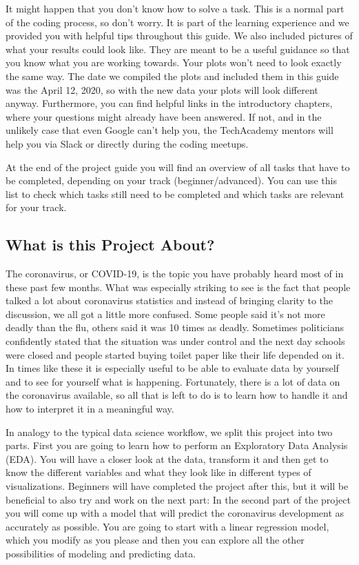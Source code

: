 \documentclass[
  11pt,
]{article}
\begin{document}
It might happen that you don't know how to solve a task. This is a normal part of the coding process, so don't worry. It is part of the learning experience and we provided you with helpful tips throughout this guide. We also included pictures of what your results could look like. They are meant to be a useful guidance so that you know what you are working towards. Your plots won't need to look exactly the same way. The date we compiled the plots and included them in this guide was the April 12, 2020, so with the new data your plots will look different anyway.
Furthermore, you can find helpful links in the introductory chapters, where your questions might already have been answered. If not, and in the unlikely case that even Google can't help you, the TechAcademy mentors will help you via Slack or directly during the coding meetups.

At the end of the project guide you will find an overview of all tasks that have to be completed, depending on your track (beginner/advanced). You can use this list to check which tasks still need to be completed and which tasks are relevant for your track.

\hypertarget{what-is-this-project-about}{%
\subsection{What is this Project About?}\label{what-is-this-project-about}}

The coronavirus, or COVID-19, is the topic you have probably heard most of in these past few months. What was especially striking to see is the fact that people talked a lot about coronavirus statistics and instead of bringing clarity to the discussion, we all got a little more confused. Some people said it's not more deadly than the flu, others said it was 10 times as deadly. Sometimes politicians confidently stated that the situation was under control and the next day schools were closed and people started buying toilet paper like their life depended on it. In times like these it is especially useful to be able to evaluate data by yourself and to see for yourself what is happening. Fortunately, there is a lot of data on the coronavirus available, so all that is left to do is to learn how to handle it and how to interpret it in a meaningful way.

In analogy to the typical data science workflow, we split this project into two parts. First you are going to learn how to perform an Exploratory Data Analysis (EDA). You will have a closer look at the data, transform it and then get to know the different variables and what they look like in different types of visualizations. Beginners will have completed the project after this, but it will be beneficial to also try and work on the next part: In the second part of the project you will come up with a model that will predict the coronavirus development as accurately as possible. You are going to start with a linear regression model, which you modify as you please and then you can explore all the other possibilities of modeling and predicting data.
\end{document}
